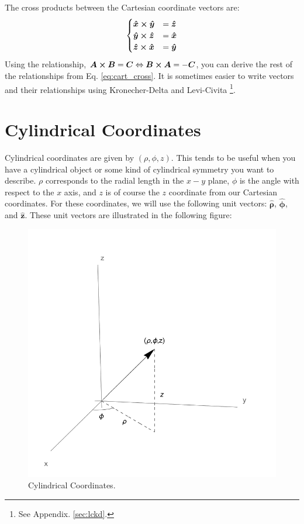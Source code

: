 \documentclass[oneside]{book}
\numberwithin{figure}{section}
\numberwithin{equation}{section}
\newcommand{\bhat}[1]{\bm{\hat{#1}}}
\theoremstyle{definition}
\begin{document}
	The cross products between the Cartesian coordinate vectors are:
	\begin{equation}\label{eq:cart_cross}
		\begin{cases}
			\bhat{x} \cross \bhat{y} &= \bhat{z}\\
			\bhat{y} \cross \bhat{z} &= \bhat{x}\\
			\bhat{z} \cross \bhat{x} &= \bhat{y}
		\end{cases}
	\end{equation}
	Using the relationship, $ \bm{A} \cross \bm{B} = \bm{C} \Leftrightarrow \bm{B} \cross \bm{A} = -\bm{C} $, you can derive the rest of the relationships from Eq. \ref{eq:cart_cross}. It is sometimes easier to write vectors and their relationships using Kronecher-Delta and Levi-Civita \footnote{See Appendix. \ref{sec:lckd}.}.

	\section{Cylindrical Coordinates}
	Cylindrical coordinates are given by $ (\rho,\phi,z) $. This tends to be useful when you have a cylindrical object or some kind of cylindrical symmetry you want to describe. $ \rho $ corresponds to the radial length in the $ x-y $ plane, $ \phi $ is the angle with respect to the $ x $ axis, and $ z $ is of course the $ z $ coordinate from our Cartesian coordinates. For these coordinates, we will use the following unit vectors: $ \bhat{\rho} $, $ \bhat{\phi} $, and $ \bhat{z} $. These unit vectors are illustrated in the following figure:
	\begin{figure}[H]
		\centering
		\includegraphics[width=0.6\columnwidth]{Figures/Coordinates/Cylindrical Coordinates.pdf}
		\caption{Cylindrical Coordinates.}
		\label{fig:cylind}
	\end{figure}
\end{document}
